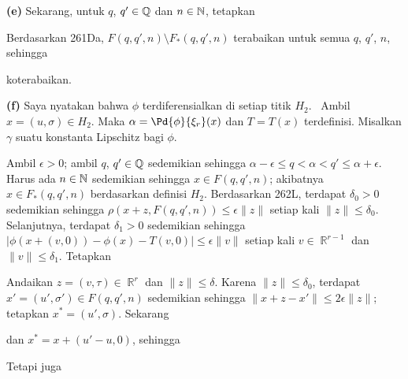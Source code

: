 {\medskip

{\bf (e)} Sekarang, untuk $q$, $q'\in\Bbb Q$ dan $n\in\Bbb N$, tetapkan



\noindent Berdasarkan 261Da, $F(q,q',n)\setminus F_*(q,q',n)$ terabaikan
untuk semua $q$, $q'$, $n$, sehingga


\noindent koterabaikan.

\medskip

{\bf (f)} Saya nyatakan bahwa $\phi$ terdiferensialkan di setiap titik
$H_2$. \Prf\ Ambil $x=(u,\sigma)\in H_2$. Maka
$\alpha=\Pd{\phi}{\xi_r}(x)$ dan $T=T(x)$ terdefinisi. Misalkan $\gamma$
suatu konstanta Lipschitz bagi $\phi$.

Ambil $\epsilon>0$; ambil $q$, $q'\in\Bbb Q$ sedemikian sehingga
$\alpha-\epsilon\le q<\alpha<q'\le\alpha+\epsilon$. Harus ada
$n\in\Bbb N$ sedemikian sehingga $x\in F(q,q',n)$; akibatnya
$x\in F_*(q,q',n)$ berdasarkan definisi $H_2$. Berdasarkan 262L, terdapat
$\delta_0>0$ sedemikian sehingga
$\rho(x+z,F(q,q',n))\le\epsilon\|z\|$ setiap kali $\|z\|\le\delta_0$.
Selanjutnya, terdapat $\delta_1>0$ sedemikian sehingga
$|\phi(x+(v,0))-\phi(x)-T(v,0)|\le\epsilon\|v\|$ setiap kali
$v\in\BbbR^{r-1}$ dan $\|v\|\le\delta_1$. Tetapkan


Andaikan $z=(v,\tau)\in\BbbR^r$ dan $\|z\|\le\delta$. Karena
$\|z\|\le\delta_0$, terdapat $x'=(u',\sigma')\in F(q,q',n)$ sedemikian
sehingga $\|x+z-x'\|\le2\epsilon\|z\|$; tetapkan $x^*=(u',\sigma)$.
Sekarang


\noindent dan $x^*=x+(u'-u,0)$, sehingga


\noindent Tetapi juga


}
